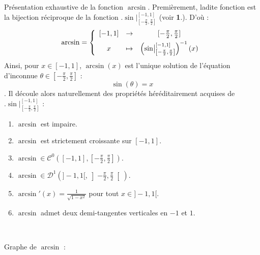 \documentclass{article}
\renewenvironment{question_kholle}[2][ ]
{
	\subsection{\texorpdfstring{#2}{}}
	\notblank{#1}
	{
		\noindent #1
		\bigbreak
	}
	{}
	\begin{proof}
}
{
	\end{proof}
}
\begin{document}
\begin{question_kholle}{Présentation exhaustive de la fonction $\arcsin$.}
  Premièrement, ladite fonction est la bijection réciproque de la fonction $\bigl.\sin\bigr|_{\left[ -\frac{\pi}{2}, \frac{\pi}{2}\right]}^{[-1,1]}$ (voir \textbf{1}.). D'où :
  \begin{equation*}
    \arcsin = \left\{
    \begin{array}{c c c}
      [-1,1] & \to     & [-\frac{\pi}{2} , \frac{\pi}{2}]                                                             \\ [1ex]
      x      & \mapsto & \left(\bigl.\sin\bigr|_{\left[ -\frac{\pi}{2}, \frac{\pi}{2}\right]}^{[-1,1]}\right)^{-1}(x)
    \end{array}
    \right.
  \end{equation*}
  Ainsi, pour $x\in [-1,1]$, $\arcsin (x)$ est l'unique solution de l'équation d'inconnue $\theta \in \textstyle \left[-\frac{\pi}{2} , \frac{\pi}{2}\right]$ :
  \[
    \sin(\theta) = x
  \]
  .
  \noindent Il découle alors naturellement des propriétés héréditairement acquises de $\bigl.\sin\bigr|_{\left[ -\frac{\pi}{2}, \frac{\pi}{2}\right]}^{[-1,1]}$ :

  \begin{enumerate}
    \item $\arcsin$ est impaire.
    \item $\arcsin$ est strictement croissante sur $[-1,1]$.
    \item $\arcsin \in \mathcal{C}^0\left([-1,1],[-\frac{\pi}{2} , \frac{\pi}{2}] \right)$.
    \item $\arcsin \in \mathcal{D}^1\left(]-1,1[,\left]-\frac{\pi}{2} , \frac{\pi}{2}\right[ \right)$.
    \item $\arcsin'(x) = \frac{1}{\sqrt{1-x^2}}$ pour tout $x\in]-1,1[$.
    \item $\arcsin$ admet deux demi-tangentes verticales en $-1$ et $1$.
  \end{enumerate}

  \

  Graphe de $\arcsin$ :
  \begin{figure}[H]
    \centering
\end{figure}
\end{question_kholle}
\end{document}

